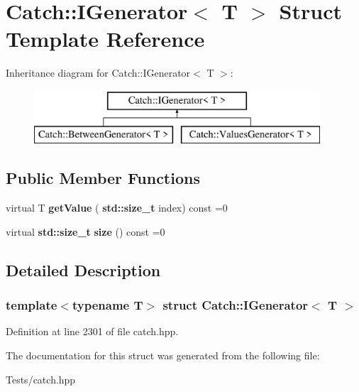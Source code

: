 \hypertarget{struct_catch_1_1_i_generator}{}\section{Catch\+:\+:I\+Generator$<$ T $>$ Struct Template Reference}
\label{struct_catch_1_1_i_generator}
Inheritance diagram for Catch\+:\+:I\+Generator$<$ T $>$\+:\begin{figure}[H]
\begin{center}
\leavevmode
\includegraphics[height=2.000000cm]{struct_catch_1_1_i_generator}
\end{center}
\end{figure}
\subsection*{Public Member Functions}
\begin{DoxyCompactItemize}
\item 
\mbox{\label{struct_catch_1_1_i_generator_ad69e937cb66dba3ed9429c42abf4fce3}} 
virtual T {\bfseries get\+Value} (\textbf{ std\+::size\+\_\+t} index) const =0
\item 
\mbox{\label{struct_catch_1_1_i_generator_a2e317253b03e838b6065ce69719a198e}} 
virtual \textbf{ std\+::size\+\_\+t} {\bfseries size} () const =0
\end{DoxyCompactItemize}


\subsection{Detailed Description}
\subsubsection*{template$<$typename T$>$\newline
struct Catch\+::\+I\+Generator$<$ T $>$}



Definition at line 2301 of file catch.\+hpp.



The documentation for this struct was generated from the following file\+:\begin{DoxyCompactItemize}
\item 
Tests/catch.\+hpp\end{DoxyCompactItemize}
